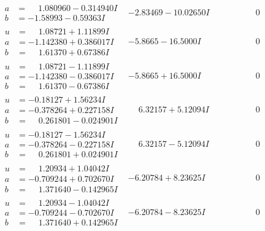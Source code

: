 \documentclass[1p]{elsarticle_modified}
\theoremstyle{definition}
\begin{document}
$$\begin{array}{c|c|c}
\begin{aligned}
a &= \phantom{-}1.080960 - 0.314940 I \\
b &= -1.58993 - 0.59363 I\end{aligned}
 & -2.83469 - 10.02650 I & \phantom{-0.000000 } 0 \\ \hline\begin{aligned}
u &= \phantom{-}1.08721 + 1.11899 I \\
a &= -1.142380 + 0.386017 I \\
b &= \phantom{-}1.61370 + 0.67386 I\end{aligned}
 & -5.8665 - 16.5000 I & \phantom{-0.000000 } 0 \\ \hline\begin{aligned}
u &= \phantom{-}1.08721 - 1.11899 I \\
a &= -1.142380 - 0.386017 I \\
b &= \phantom{-}1.61370 - 0.67386 I\end{aligned}
 & -5.8665 + 16.5000 I & \phantom{-0.000000 } 0 \\ \hline\begin{aligned}
u &= -0.18127 + 1.56234 I \\
a &= -0.378264 + 0.227158 I \\
b &= \phantom{-}0.261801 - 0.024901 I\end{aligned}
 & \phantom{-}6.32157 + 5.12094 I & \phantom{-0.000000 } 0 \\ \hline\begin{aligned}
u &= -0.18127 - 1.56234 I \\
a &= -0.378264 - 0.227158 I \\
b &= \phantom{-}0.261801 + 0.024901 I\end{aligned}
 & \phantom{-}6.32157 - 5.12094 I & \phantom{-0.000000 } 0 \\ \hline\begin{aligned}
u &= \phantom{-}1.20934 + 1.04042 I \\
a &= -0.709244 + 0.702670 I \\
b &= \phantom{-}1.371640 - 0.142965 I\end{aligned}
 & -6.20784 + 8.23625 I & \phantom{-0.000000 } 0 \\ \hline\begin{aligned}
u &= \phantom{-}1.20934 - 1.04042 I \\
a &= -0.709244 - 0.702670 I \\
b &= \phantom{-}1.371640 + 0.142965 I\end{aligned}
 & -6.20784 - 8.23625 I & \phantom{-0.000000 } 0 \\ \hline\begin{aligned}

\end{aligned}
\end{array}$$
\end{document}
